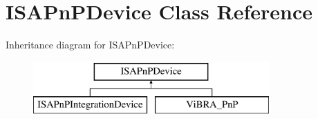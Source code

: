 \hypertarget{classISAPnPDevice}{\section{I\-S\-A\-Pn\-P\-Device Class Reference}
\label{classISAPnPDevice}
}
Inheritance diagram for I\-S\-A\-Pn\-P\-Device\-:\begin{figure}[H]
\begin{center}
\leavevmode
\includegraphics[height=2.000000cm]{classISAPnPDevice}
\end{center}
\end{figure}
